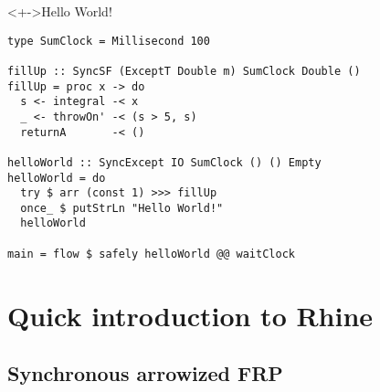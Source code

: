 \documentclass[handout]{enigtex-beamer-base}
\begin{document}
\begin{frame}[fragile]
\begin{block}<+->{Hello World!}
\begin{verbatim}
type SumClock = Millisecond 100

fillUp :: SyncSF (ExceptT Double m) SumClock Double ()
fillUp = proc x -> do
  s <- integral -< x
  _ <- throwOn' -< (s > 5, s)
  returnA       -< ()

helloWorld :: SyncExcept IO SumClock () () Empty
helloWorld = do
  try $ arr (const 1) >>> fillUp
  once_ $ putStrLn "Hello World!"
  helloWorld

main = flow $ safely helloWorld @@ waitClock
\end{verbatim}
\end{block}
\end{frame}


\section{Quick introduction to Rhine}

\subsection{Synchronous arrowized FRP}
\end{document}
